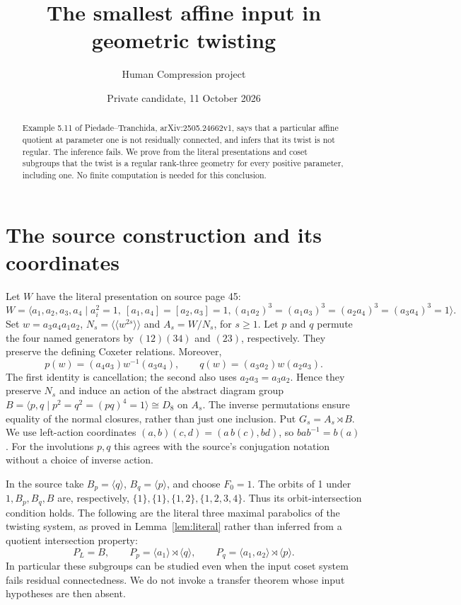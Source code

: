 
\title{The smallest affine input in geometric twisting}
\author{Human Compression project}
\date{Private candidate, 11 October 2026}

\maketitle
\begin{abstract}
Example 5.11 of Piedade--Tranchida, arXiv:2505.24662v1, says that a
particular affine quotient at parameter one is not residually connected,
and infers that its twist is not regular. The inference fails. We prove
from the literal presentations and coset subgroups that the twist is a
regular rank-three geometry for every positive parameter, including one.
No finite computation is needed for this conclusion.
\end{abstract}

\section{The source construction and its coordinates}
Let $W$ have the literal presentation on source page 45:
\[
 W=\langle a_1,a_2,a_3,a_4\mid a_i^2=1,\ [a_1,a_4]=[a_2,a_3]=1,
 (a_1a_2)^3=(a_1a_3)^3=(a_2a_4)^3=(a_3a_4)^3=1\rangle.
\]
Set $w=a_3a_4a_1a_2$, $N_s=\langle\!\langle w^{2s}\rangle\!\rangle$
and $A_s=W/N_s$, for $s\geq1$. Let $p$ and $q$ permute the four
named generators by $(12)(34)$ and $(23)$, respectively. They preserve
the defining Coxeter relations. Moreover,
\begin{equation}\label{eq:invariance}
 p(w)=(a_4a_3)w^{-1}(a_3a_4),\qquad
 q(w)=(a_3a_2)w(a_2a_3).
\end{equation}
The first identity is cancellation; the second also uses
$a_2a_3=a_3a_2$. Hence they preserve $N_s$ and induce an action
of the abstract diagram group
$B=\langle p,q\mid p^2=q^2=(pq)^4=1\rangle\cong D_8$
on $A_s$. The inverse permutations ensure equality of the normal
closures, rather than just one inclusion. Put $G_s=A_s\rtimes B$.
We use left-action coordinates
$(a,b)(c,d)=(a\,b(c),bd)$, so $bab^{-1}=b(a)$.
For the involutions $p,q$ this agrees with the source's conjugation
notation without a choice of inverse action.

In the source take $B_p=\langle q\rangle$,
$B_q=\langle p\rangle$, and choose $F_0=1$. The orbits of 1
under $1,B_p,B_q,B$ are, respectively,
$\{1\},\{1\},\{1,2\},\{1,2,3,4\}$. Thus its orbit-intersection
condition holds. The following are the literal three maximal parabolics of the twisting
system, as proved in Lemma~\ref{lem:literal} rather than inferred
from a quotient intersection property:
\begin{equation}\label{eq:maximal-literal}
 P_L=B,\qquad
 P_p=\langle a_1\rangle\rtimes\langle q\rangle,\qquad
 P_q=\langle a_1,a_2\rangle\rtimes\langle p\rangle.
\end{equation}
In particular these subgroups can be studied even when the input
coset system fails residual connectedness. We do not invoke a transfer
theorem whose input hypotheses are then absent.

